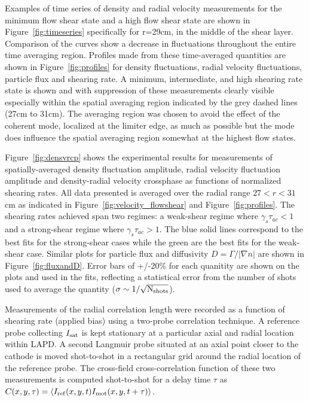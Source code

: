 \documentclass[aip,pop,amsmath,amssymb,preprint,superscriptaddress]{revtex4-1} %
\begin{document}
Examples of time series of density and radial velocity measurements for the minimum flow shear state and a high flow shear state are shown in Figure~\ref{fig:timeseries} specifically for r=29cm, in the middle of the shear layer. Comparison of the curves show a decrease in fluctuations throughout the entire time averaging region. Profiles made from these time-averaged quantities are shown in Figure~\ref{fig:profiles} for density fluctuations, radial velocity fluctuations, particle flux and shearing rate. A minimum, intermediate, and high shearing rate state is shown and with suppression of these measurements clearly visible especially within the spatial averaging region indicated by the grey dashed lines (27cm to 31cm). The averaging region was chosen to avoid the effect of the coherent mode, localized at the limiter edge, as much as possible but the mode does influence the spatial averaging region somewhat at the highest flow states.

Figure~\ref{fig:densvrcp} shows the experimental
results for measurements of spatially-averaged density fluctuation amplitude, radial
velocity fluctuation amplitude and density-radial velocity crossphase as functions
of normalized shearing rates. All data presented is averaged over the radial range $27 < r < 31$cm as indicated in Figure~\ref{fig:velocity_flowshear} and Figure~\ref{fig:profiles}. The shearing rates achieved span two
regimes: a weak-shear regime where $\gamma_{s}\tau_{ac} < 1$ and a
strong-shear regime where $\gamma_{s}\tau_{ac} > 1$. The blue solid
lines correspond to the best fits for the strong-shear cases while the
green are the best fits for the weak-shear case.  Similar plots for
particle flux and diffusivity $D = \Gamma/|\nabla n|$ are shown in
Figure~\ref{fig:fluxandD}. Error bars of +/-20\% for each quanitity are
shown on the plots and used in the fits, reflecting a statistical
error from the number of shots used to average the quantity ($\sigma
\sim 1/\sqrt{\rm N_{shots}}$). 

Measurements of the radial correlation length were recorded as a function of shearing rate (applied bias) using a two-probe correlation technique. A reference probe collecting $I_{\rm sat}$ is kept stationary at a particular axial and radial location within LAPD. A second Langmuir probe situated at an axial point closer to the cathode is moved shot-to-shot in a rectangular grid around the radial location of the reference probe.  The cross-field cross-correlation function of these two measurements is computed shot-to-shot for a delay time $\tau$ as $C(x,y,\tau) = \langle I_{\rm ref}(x,y,t)I_{\rm mot}(x,y,t+\tau)\rangle$.
\end{document}
